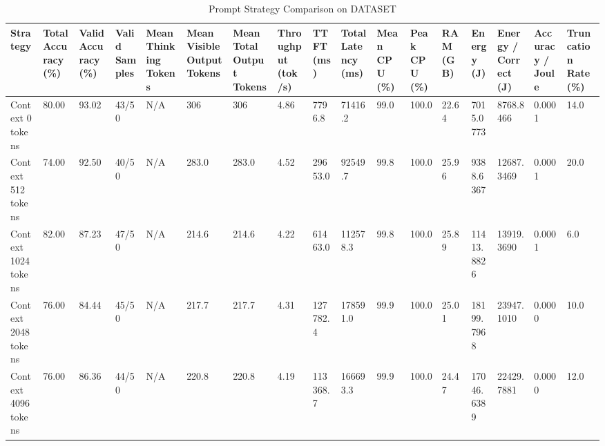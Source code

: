 \begin{table}
\caption{Prompt Strategy Comparison on DATASET}
\label{tab:strategy_comparison}
\begin{tabular}{lllllllllllllllll}
\toprule
Strategy & Total Accuracy (\%) & Valid Accuracy (\%) & Valid Samples & Mean Thinking Tokens & Mean Visible Output Tokens & Mean Total Output Tokens & Throughput (tok/s) & TTFT (ms) & Total Latency (ms) & Mean CPU (\%) & Peak CPU (\%) & RAM (GB) & Energy (J) & Energy / Correct (J) & Accuracy / Joule & Truncation Rate (\%) \\
\midrule
Context 0 tokens & 80.00 & 93.02 & 43/50 & N/A & 306 & 306 & 4.86 & 7796.8 & 71416.2 & 99.0 & 100.0 & 22.64 & 7015.0773 & 8768.8466 & 0.0001 & 14.0 \\
Context 512 tokens & 74.00 & 92.50 & 40/50 & N/A & 283.0 & 283.0 & 4.52 & 29653.0 & 92549.7 & 99.8 & 100.0 & 25.96 & 9388.6367 & 12687.3469 & 0.0001 & 20.0 \\
Context 1024 tokens & 82.00 & 87.23 & 47/50 & N/A & 214.6 & 214.6 & 4.22 & 61463.0 & 112578.3 & 99.8 & 100.0 & 25.89 & 11413.8826 & 13919.3690 & 0.0001 & 6.0 \\
Context 2048 tokens & 76.00 & 84.44 & 45/50 & N/A & 217.7 & 217.7 & 4.31 & 127782.4 & 178591.0 & 99.9 & 100.0 & 25.01 & 18199.7968 & 23947.1010 & 0.0000 & 10.0 \\
Context 4096 tokens & 76.00 & 86.36 & 44/50 & N/A & 220.8 & 220.8 & 4.19 & 113368.7 & 166693.3 & 99.9 & 100.0 & 24.47 & 17046.6389 & 22429.7881 & 0.0000 & 12.0 \\
\bottomrule
\end{tabular}
\end{table}
